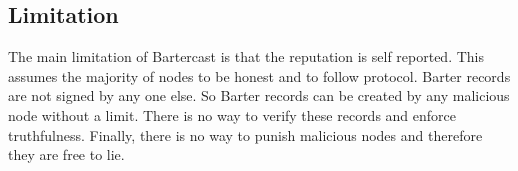 \subsection{Limitation}
The main limitation of Bartercast is that the reputation is self reported.
This assumes the majority of nodes to be honest and to follow protocol.
Barter records are not signed by any one else.
So Barter records can be created by any malicious node without a limit.
There is no way to verify these records and enforce truthfulness.
Finally, there is no way to punish malicious nodes and therefore they are free to lie.



